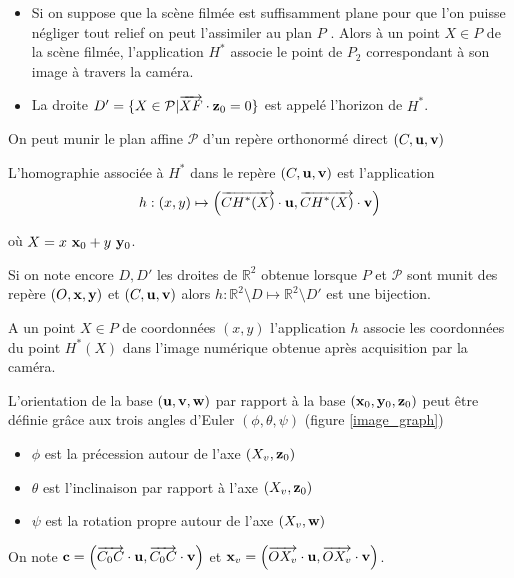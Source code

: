 \begin{remarque}
\begin{itemize}
\item Si on suppose que la scène filmée est suffisamment plane pour que l'on puisse  négliger tout relief on peut l'assimiler au plan $P$ . Alors à un point $X\in P$  de la scène filmée, l'application $H^*$ associe le point de $P_2$ correspondant à son image à travers la caméra.
\item La droite $D'=\{ X \in \mathcal{P} | \overrightarrow{XF} \cdot \mathbf{z}_0 =0 \}$ est appelé l'horizon de $H^*$.
\end{itemize}

\end{remarque}
On peut munir le plan affine $\mathcal{P}$ d'un repère orthonormé direct $(C,\mathbf{u},\mathbf{v})$ 
\begin{Def}
 L'homographie associée à $H^*$ dans le repère $(C,\mathbf{u},\mathbf{v})$ est l'application
\begin{equation}
h : (x,y)  \mapsto \left( \overrightarrow{CH^*(X)}\cdot \mathbf{u} , \overrightarrow{CH^*(X)}\cdot \mathbf{v} \right)
\label{formule_homographie_H}
\end{equation}


où $X=x~\mathbf{x}_0 + y~\mathbf{y}_0 $.
\label{def_homographie_H}
\end{Def}
Si on note encore $D,D'$ les droites de $\mathbb{R}^2$ obtenue lorsque $P$ et $\mathcal{P}$ sont munit des repère $(O,\mathbf{x},\mathbf{y})$ et $(C,\mathbf{u},\mathbf{v})$ alors $h:\mathbb{R}^2  \setminus D \mapsto \mathbb{R}^2  \setminus D'$ est une bijection.
\begin{remarque}
A un point $X\in P$ de coordonnées $(x,y)$  l'application $h$ associe les coordonnées  du point $H^*(X)$ dans l'image numérique obtenue après acquisition par la caméra. 
\end{remarque}
L'orientation de la base $(\mathbf{u},\mathbf{v},\mathbf{w})$ par rapport à la base $(\mathbf{x}_0,\mathbf{y}_0,\mathbf{z}_0)$ peut être définie grâce aux trois angles d'Euler $(\phi , \theta ,\psi )$ (figure \ref{image_graph})
\begin{itemize}
\item $\phi$ est la précession autour de l'axe $(X_v ,\mathbf{z}_0)$
\item $\theta$ est l'inclinaison par rapport à l'axe $(X_v , \mathbf{z}_0 )$
\item $\psi$ est la rotation propre autour de l'axe $(X_v , \mathbf{w} )$
\end{itemize}
On note $\mathbf{c}= \left (\overrightarrow{C_0 C}\cdot \mathbf{u} , \overrightarrow{C_0 C}\cdot \mathbf{v} \right)$ et $\mathbf{x}_v=\left( \overrightarrow{O X_v}\cdot \mathbf{u} , \overrightarrow{O X_v}\cdot \mathbf{v} \right )$.\\
